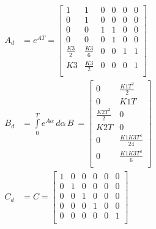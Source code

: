 \begin{subequations}\label{eq:discrete_matrices}
    \begin{align}
    A_d &= e^{AT} = \begin{bmatrix}
    1 & 1 & 0 & 0 & 0 & 0\\
    0 & 1 & 0 & 0 & 0 & 0\\
    0 & 0 & 1 & 1 & 0 & 0\\
    0 & 0 & 0 & 1 & 0 & 0\\
    \frac{K3}{2} & \frac{K3}{6} & 0 & 0 & 1 & 1\\
    K3 & \frac{K3}{2} & 0 & 0 & 0 & 1\\
    \end{bmatrix} \label{eq:discrete_Ad}\\
    B_d &= \int\limits_0^T e^{A\alpha} \, d\alpha \, B \ = \begin{bmatrix}
    0 & \frac{K1T^2}{2} \\
    0 & K1T \\
    \frac{K2T^2}{2} & 0 \\
    K2T & 0 \\
    0 & \frac{K1K3T^4}{24} \\
    0 & \frac{K1K3T^3}{6} \\
    \end{bmatrix} \label{eq:discrete_Bd}\\
    C_d &= C = \begin{bmatrix}
        1 & 0 & 0 & 0 & 0 & 0\\
        0 & 1 & 0 & 0 & 0 & 0\\
        0 & 0 & 1 & 0 & 0 & 0\\
        0 & 0 & 0 & 1 & 0 & 0\\
        0 & 0 & 0 & 0 & 0 & 1\\
    \end{bmatrix}\label{eq:discrete_Cd}
    \end{align}
\end{subequations}
